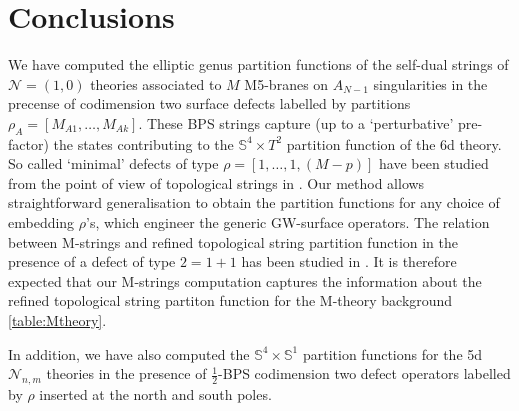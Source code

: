 \documentclass[main.tex]{subfiles}
\begin{document}
\section{Conclusions}
We have computed the elliptic genus partition functions of the self-dual strings of $\mathcal{N}=(1,0)$ theories associated to $M$ M5-branes on $A_{N-1}$ singularities in the precense of codimension two surface defects labelled by partitions $\rho_A=[M_{A1},\dots,M_{Ak}]$. These BPS strings capture (up to a `perturbative' pre-factor) the states contributing to the $\mathbb{S}^4\times T^2$ partition function of the 6d theory. So called `minimal' defects of type $\rho=[1,\dots,1,(M-p)]$ have been studied from the point of view of topological strings in \cite{Mori:2016qof,Iqbal:2012xm,Vafa:2012fi,Taki:2010bj}. Our method allows straightforward generalisation to obtain the partition functions for any choice of embedding $\rho$'s, which engineer the generic GW-surface operators. The relation between M-strings and refined topological string partition function in the presence of a defect of type $2=1+1$ has been studied in \cite{Mori:2016qof}. It is therefore expected that our M-strings computation captures the information about the refined topological string partiton function for the M-theory background \ref{table:Mtheory}. 

In addition, we have also computed the $\mathbb{S}^4\times \mathbb{S}^1$ partition functions for the 5d $\mathcal{N}_{n,m}$ theories in the presence of $\frac{1}{2}$-BPS codimension two defect operators labelled by $\rho$ inserted at the north and south poles.
\end{document}
